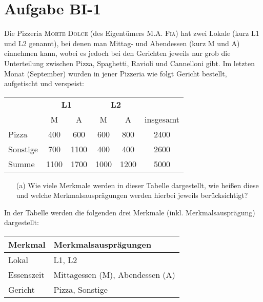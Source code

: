 
\section{Aufgabe BI-1}

\begin{task}
    Die Pizzeria \textsc{Morte Dolce} (des Eigentümers \textsc{M.A. Fia}) hat zwei Lokale (kurz L1 und L2 genannt), bei denen man Mittag- und Abendessen (kurz M und A) einnehmen kann, wobei es jedoch bei den Gerichten jeweils nur grob die Unterteilung zwischen Pizza, Spaghetti, Ravioli und Cannelloni gibt. Im letzten Monat (September) wurden in jener Pizzeria wie folgt Gericht bestellt, aufgetischt und verspeist:

    \begin{table}[H]
    \centering
    \begin{tabular}{l||cc|cc||c}
        \multirow{2}{*}{} & \multicolumn{2}{c|}{\bf{L1}}  & \multicolumn{2}{c||}{\bf{L2}} &                         \\
                          & \multicolumn{1}{c}{M}         & A    & \multicolumn{1}{c}{M}  & A           & insgesamt \\ \hline\hline
        Pizza             & \multicolumn{1}{c}{400}       & 600  & 600                    & 800         & 2400      \\
        Sonstige          & \multicolumn{1}{c}{700}       & 1100 & 400                    & 400         & 2600      \\ \hline
        Summe             & \multicolumn{1}{c}{1100}      & 1700 & 1000                   & 1200        & 5000     
    \end{tabular}
    \end{table}

    \begin{enumerate}
        \item[(a)] Wie viele Merkmale werden in dieser Tabelle dargestellt, wie heißen diese und welche Merkmalsausprägungen werden hierbei jeweils berücksichtigt?
    \end{enumerate}
\end{task}

In der Tabelle werden die folgenden drei Merkmale (inkl. Merkmalsausprägung) dargestellt:

\begin{table}[H]
\centering
\begin{tabular}{l|l}
    Merkmal & Merkmalsausprägungen \\ \hline
    Lokal & L1, L2 \\
    Essenszeit & Mittagessen (M), Abendessen (A) \\
    Gericht & Pizza, Sonstige
\end{tabular}
\end{table}


